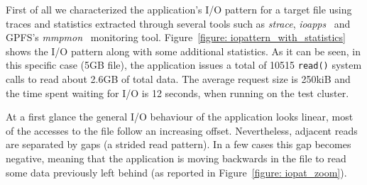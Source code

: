 First of all we characterized the application's I/O pattern for a target file using traces and statistics extracted through several tools such as \textit{strace}, \textit{ioapps}~\cite{ioapps} and GPFS's \textit{mmpmon}~\cite{mmpmon} monitoring tool. Figure~\ref{figure: iopattern_with_statistics} shows the I/O pattern along with some additional statistics. As it can be seen, in this specific case (5GB file), the application issues a total of 10515 \texttt{read()} system calls to read about 2.6GB of total data. The average request size is 250kiB and the time spent waiting for I/O is 12 seconds, when running on the test cluster. 

At a first glance the general I/O behaviour of the application looks linear, most of the accesses to the file follow an increasing offset. Nevertheless, adjacent reads are separated by gaps (a strided read pattern). In a few cases this gap becomes negative, meaning that the application is moving backwards in the file to read some data previously left behind (as reported in Figure~\ref{figure: iopat_zoom}). %


